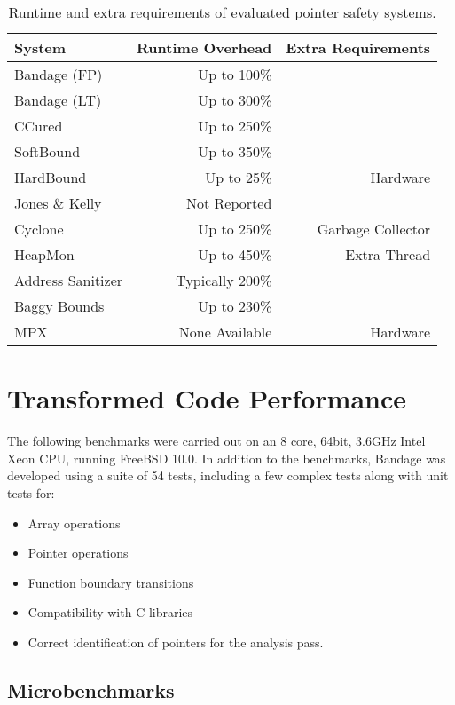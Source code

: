 \begin{table}
\centering
\begin{tabular}{l|r|r}
System & Runtime Overhead & Extra Requirements \\
\hline
Bandage (FP)            &Up to 100\%&\\
Bandage (LT)            &Up to 300\%&\\

CCured              &Up to 250\%&\\
SoftBound           &Up to 350\%&\\
HardBound           &Up to 25\%&Hardware\\
Jones \& Kelly      &Not Reported&\\
Cyclone             &Up to 250\%&Garbage Collector\\
HeapMon             &Up to 450\%&Extra Thread\\
Address Sanitizer   &Typically 200\%&\\
Baggy Bounds        &Up to 230\%&\\
MPX                 &None Available&Hardware\\
\end{tabular}
\caption{Runtime and extra requirements of evaluated pointer safety systems.}
\label{fig:Others}
\end{table}

\section{Transformed Code Performance}

The following benchmarks were carried out on an 8 core, 64bit, 3.6GHz Intel Xeon CPU, running FreeBSD 10.0.
In addition to the benchmarks, Bandage was developed using a suite of 54 tests, including a few complex tests along with unit tests for:

\begin{itemize}
\item Array operations
\item Pointer operations
\item Function boundary transitions
\item Compatibility with C libraries
\item Correct identification of pointers for the analysis pass.
\end{itemize}

\subsection{Microbenchmarks}

